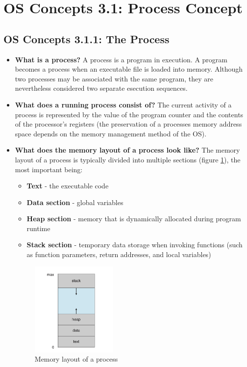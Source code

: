 \documentclass[12pt]{article}
\begin{document}
\section*{OS Concepts 3.1: Process Concept}

\subsection*{OS Concepts 3.1.1: The Process}

\begin{itemize}
    \item \textbf{What is a process?} A process is a program in execution. A program becomes a process when an executable file is loaded into memory. Although two processes may be associated with the same program, they are nevertheless considered two separate esecution sequences.
    \item \textbf{What does a running process consist of?} The current activity of a process is represented by the value of the program counter and the contents of the processor's registers (the preservation of a processes memory address space depends on the memory management method of the OS).
    \item \textbf{What does the memory layout of a process look like?} The memory layout of a process is typically divided into multiple sections (figure \ref{fig:process-memory-layout}), the most important being:
        \begin{itemize}
            \item \textbf{Text} - the executable code
            \item \textbf{Data section} - global variables
            \item \textbf{Heap section} - memory that is dynamically allocated during program runtime
            \item \textbf{Stack section} - temporary data storage when invoking functions (such as function parameters, return addresses, and local variables)
        \end{itemize}
        \begin{figure}[ht]
            \centering
            \includegraphics[width=0.4\textwidth]{figures/process-memory-layout.jpg}
            \caption{Memory layout of a process}
            \label{fig:process-memory-layout}
        \end{figure}
\end{itemize}
\end{document}
